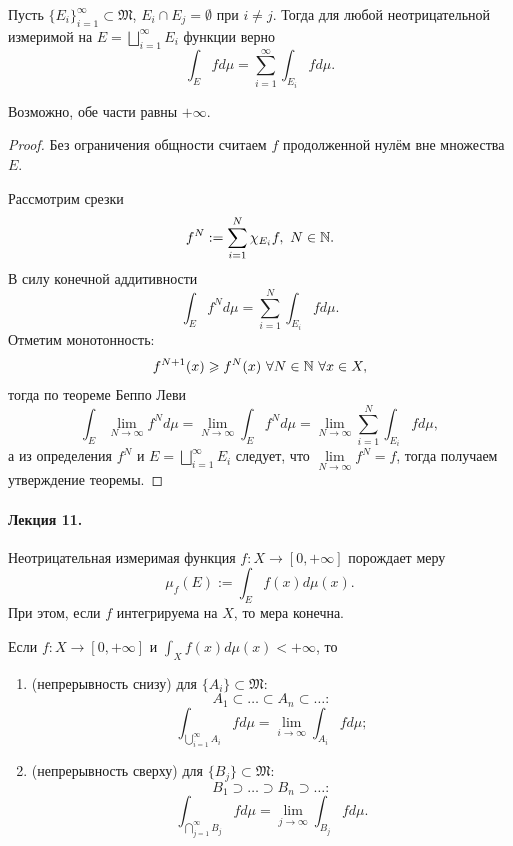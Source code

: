 \begin{theorem}
    Пусть $\{E_i\}_{i=1}^\infty \subset \mathfrak{M}$, $E_i \cap E_j = \emptyset$ при $i \neq j$.
    Тогда для любой неотрицательной измеримой на $E = \bigsqcup\limits_{i=1}^{\infty}E_i$ функции верно
    \[\int_E f d\mu = \sum\limits_{i=1}^{\infty}\int_{E_i} f d\mu.\]
\end{theorem} 
\begin{remark}
    Возможно, обе части равны $+\infty$.
\end{remark}
\begin{proof}
    Без ограничения общности считаем $f$ продолженной нулём вне множества $E$.

    Рассмотрим срезки
    \[f^N := \sum\limits_{i=1}^{N} \chi_{E_i} f, \ N \in \mathbb{N}.\]
    В силу конечной аддитивности
    \[\int_E f^N d\mu = \sum\limits_{i=1}^{N} \int_{E_i} f d\mu.\]
    Отметим монотонность:
    \[f^{N+1}(x) \geqslant f^N(x) \ \forall N \in \mathbb{N} \ \forall x \in X,\]
    тогда по теореме Беппо Леви
    \[\int_E \lim\limits_{N \to \infty} f^N d\mu 
    = \lim\limits_{N \to \infty} \int_E f^N d\mu
    = \lim\limits_{N \to \infty} \sum\limits_{i=1}^{N} \int_{E_i} f d\mu,\]
    а из определения $f^N$ и $E = \bigsqcup\limits_{i=1}^{\infty}E_i$ следует, что $\lim\limits_{N\to \infty} f^N = f$,
    тогда получаем утверждение теоремы.
\end{proof} 


\paragraph{Лекция 11.}

\begin{corollary}[1]
    Неотрицательная измеримая функция $f: X \to [0, +\infty]$ порождает меру
    \[\mu_f(E) := \int_E f(x) d\mu(x).\]
    При этом, если $f$ интегрируема на $X$, то мера конечна.
\end{corollary}

\begin{corollary}[2]
    Если $f: X \to [0, +\infty]$ и $\int_X f(x) d\mu(x) < +\infty$,
    то
    \begin{enumerate}
        \item (непрерывность снизу) для $\{A_i\} \subset \mathfrak{M}$:
        \[A_1 \subset \dots \subset A_n \subset \dots:\]
        \[\int_{\bigcup\limits_{i=1}^{\infty}A_i} f d\mu = \lim\limits_{i \to \infty} \int_{A_i} f d\mu;\]
        \item (непрерывность сверху) для $\{B_j\} \subset \mathfrak{M}$:
        \[B_1 \supset \dots \supset B_n \supset \dots:\]
        \[\int_{\bigcap\limits_{j=1}^{\infty} B_j} f d\mu = \lim\limits_{j \to \infty} \int_{B_j} fd\mu.\]
    \end{enumerate}
\end{corollary}

